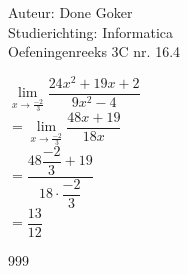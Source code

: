 \documentclass[a4paper]{article}
\begin{document}
  
\noindent \large Auteur: Done Goker \\
\noindent \large Studierichting: Informatica\\
\noindent \large Oefeningenreeks 3C nr. 16.4\\

\medskip

\normalsize

$\lim\limits_{x\rightarrow \tfrac{-2}{3}} \dfrac{24x^2 + 19x + 2}{9x^2 -4}$ \\

$ = \lim\limits_{x\rightarrow \tfrac{-2}{3}} \dfrac{48x + 19}{18x}$ \\

$ =  \dfrac{48\dfrac{-2}{3}+ 19}{18\cdot \dfrac{-2}{3}}$ \\

$ =  \dfrac{13}{12} $    \\


\begin{thebibliography}{999}
\end{thebibliography}
\end{document}
